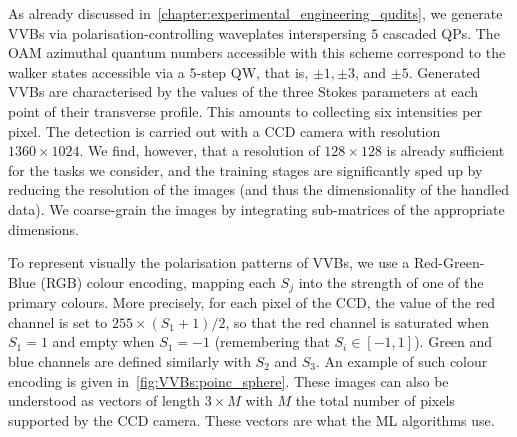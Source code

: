 As already discussed in~\cref{chapter:experimental_engineering_qudits}, we generate VVBs via polarisation-controlling waveplates interspersing $5$ cascaded QPs.
The OAM azimuthal quantum numbers accessible with this scheme correspond to the walker states accessible via a $5$-step QW, that is, $\pm1,\pm3$, and $\pm5$.
Generated VVBs are characterised by the values of the three Stokes parameters at each point of their transverse profile. This amounts to collecting six intensities per pixel. The detection is carried out with a \ac{CCD} camera with resolution $1360 \times 1024$. 
We find, however, that a resolution of $128 \times 128$ is already sufficient for the tasks we consider, and the training stages are significantly sped up by reducing the resolution of the images (and thus the dimensionality of the handled data). We coarse-grain the images by integrating sub-matrices of the appropriate dimensions.

To represent visually the polarisation patterns of VVBs, we use a Red-Green-Blue (RGB) colour encoding, mapping each $S_j$ into the strength of one of the primary colours.
More precisely, for each pixel of the CCD, the value of the red channel is set to $255\times(S_1+1)/2$, so that the red channel is saturated when $S_1=1$ and empty when $S_1=-1$ (remembering that $S_i\in[-1,1]$). Green and blue channels are defined similarly with $S_2$ and $S_3$.
An example of such colour encoding is given in~\cref{fig:VVBs:poinc_sphere}.
These images can also be understood as vectors of length $3\times M$ with $M$ the total number of pixels supported by the CCD camera. These vectors are what the ML algorithms use.

